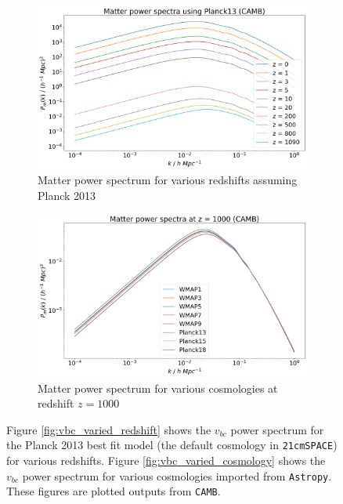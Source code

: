 \documentclass[floats,floatfix,showpacs,amssymb,prd,superscriptaddress,nofootinbib]{revtex4-2} %
\newcommand{\code}{\texttt}
\begin{document}
\begin{figure}[!htbp]
\begin{subfigure}{0.45\textwidth}
         \centering
         \includegraphics[width=\textwidth]{images/matter_power_spectrum_varied_redshift.png}
         \caption{Matter power spectrum for various redshifts assuming Planck 2013}
         \label{fig:matter_power_spectrum_varied_redshift}
     \end{subfigure}
     \hfill
     \begin{subfigure}{0.45\textwidth}
         \centering
         \includegraphics[width=\textwidth]{images/matter_power_spectrum_varied_cosmology.png}
         \caption{Matter power spectrum for various cosmologies at redshift $z = 1000$}
         \label{fig:matter_power_spectrum_varied_cosmology}
     \end{subfigure}
    \caption{Figure \ref{fig:vbc_varied_redshift} shows the $v_{bc}$ power spectrum for the Planck 2013 best fit model (the default cosmology in \code{21cmSPACE}) for various redshifts. Figure \ref{fig:vbc_varied_cosmology} shows the $v_{bc}$ power spectrum for various cosmologies imported from \code{Astropy}. These figures are plotted outputs from \code{CAMB}.}
    \label{fig:camb_output_plots}
\end{figure}
\end{document}
